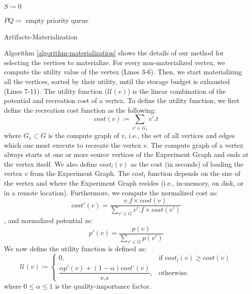 \begin{algorithm}[h]
$S \coloneqq 0$

$PQ \coloneqq $ empty priority queue\;

\caption{Artifacts-Materialization}\label{algorithm-materialization}
\end{algorithm}

Algorithm \ref{algorithm-materialization} shows the details of our method for selecting the vertices to materialize.
For every non-materialized vertex, we compute the utility value of the vertex (Lines 3-6).
Then, we start materializing all the vertices, sorted by their utility, until the storage budget is exhausted (Lines 7-11).
The utility function ($\mathcal{U}(v) $) is the linear combination of the potential and recreation cost of a vertex.
To define the utility function, we first define the recreation cost function as the following:  
\[
cost(v) \coloneqq \sum\limits_{v' \in G_v} v'.t
\]
where $G_v \subset G$ is the compute graph of $v$, i.e., the set of all vertices and edges which one must execute to recreate the vertex $v$.
The compute graph of a vertex always starts at one or more source vertices of the Experiment Graph and ends at the vertex itself.
We also define $cost_l(v)$ as the cost (in seconds) of  loading the vertex $v$ from the Experiment Graph. 
The $cost_l$ function depends on the size of the vertex and where the Experiment Graph resides (i.e., in-memory, on disk, or in a remote location).
Furthermore, we compute the normalized cost as:
\[cost'(v) = \dfrac{v.f  \times cost(v) }{\sum\limits_{v' \in G} v'.f \times cost(v')}\],
and normalized potential as:
\[p'(v) = \dfrac{p(v) }{\sum\limits_{v' \in G} p(v')}\]
We now define the utility function is defined as: 
\[
\mathcal{U}(v) \coloneqq  	
		\begin{cases}
		0, & \text{if }  cost_l(v) \ge cost(v)  \\ 
		\dfrac{\alpha p'(v) + (1-\alpha)cost'(v)}{v.s}, & \text{otherwise}.
		\end{cases}
\]
where $0 \leq \alpha \leq 1$ is the quality-importance factor.
